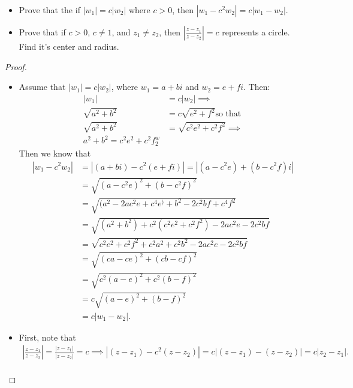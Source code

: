 \documentclass[12pt]{article}
\newenvironment{statement}[2][Statement]{\begin{trivlist}
\item[\hskip \labelsep {\bfseries #1}\hskip \labelsep {\bfseries #2.}]}{\end{trivlist}}
\begin{document}
\begin{statement}[Problem]{4}
  \begin{itemize}
    \item[(a)] Prove that the if $|w_1|=c|w_2|$ where $c > 0$, then $|w_1 - c^2 w_2| = c|w_1-w_2|$.
    \item[(b)] Prove that if $c >0$, $c \neq 1$, and $z_1 \neq z_2$, then $| \frac{z-z_1}{z-z_2} | = c$ represents a circle. 
      Find it's center and radius. 
  \end{itemize}
\end{statement}
\begin{proof}
  \begin{itemize}
    \item[(a)] Assume that $|w_1|=c|w_2|$, where $w_1=a+bi$ and $w_2=e+fi$. Then: 
      \begin{align*}
        |w_1| &= c|w_2| \implies \\
        \sqrt{a^2+b^2} &= c \sqrt{e^2+f^2} \text{so that} \\
        \sqrt{a^2+b^2} &= \sqrt{c^2e^2+c^2f^2} \implies \\
        a^2+b^2 = c^2e^2 + c^2f^w_2
      \end{align*}
      Then we know that 
      \begin{align*}
        |w_1 - c^2w_2| &= |(a+bi) - c^2(e+fi)|=|(a-c^2e)+(b-c^2f)i| \\
                       &= \sqrt{(a-c^2e)^2 + (b-c^ 2f)^2} \\
                       &= \sqrt{(a^2-2ac^2e+c^4e^)+b^2-2c^2bf+c^4f^2} \\
                       &= \sqrt{(a^2+b^2) + c^2(c^2e^2+c^2f^2)-2ac^2e-2c^2bf} \\
                       &= \sqrt{c^2e^2 + c^2f^2 +c^2a^2+c^2b^2-2ac^2e-2c^2bf} \\
                       &= \sqrt{(ca-ce)^2 + (cb-cf)^2} \\
                       &= \sqrt{c^2(a-e)^2 + c^2(b-f)^2} \\
                       &= c \sqrt{(a-e)^2 + (b-f)^2} \\
                       &= c|w_1-w_2|.
      \end{align*}
    \item[(b)] First, note that 
      \begin{align*}
        | \frac{z-z_1}{z-z_2}| = \frac{|z-z_1|}{|z-z_2|} = c 
        \implies | (z-z_1) - c^2(z-z_2)| = c|(z-z_1)-(z-z_2)|=c|z_2-z_1|. \\

\end{align*}
\end{itemize}
\end{proof}
\end{document}
